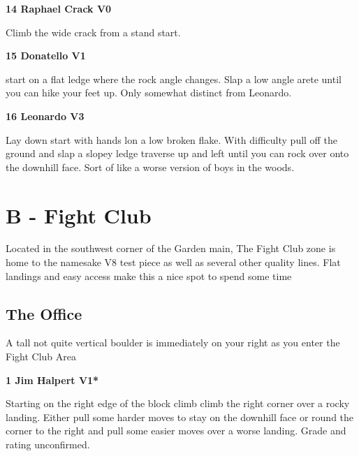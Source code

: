 \begin{multicols}{2}
					\label{rt:Raphael Crack}
\colorbox{green!20}{
\parbox{0.95\linewidth}{
\textbf{
14 Raphael Crack V0   
}
}
}

					\begin{adjustwidth}{0.5cm}{}				
					Climb the wide crack from a stand start.
					\end{adjustwidth}
					\label{rt:Donatello}
\colorbox{green!20}{
\parbox{0.95\linewidth}{
\textbf{
15 Donatello V1   
}
}
}

					\begin{adjustwidth}{0.5cm}{}				
					start on a flat ledge where the rock angle changes. Slap a low angle arete until you can hike your feet up. Only somewhat distinct from Leonardo.
					\end{adjustwidth}
					\label{rt:Leonardo}
\colorbox{green!20}{
\parbox{0.95\linewidth}{
\textbf{
16 Leonardo V3   
}
}
}

					\begin{adjustwidth}{0.5cm}{}				
					Lay down start with hands lon a low broken flake. With difficulty pull off the ground and slap a slopey ledge traverse up and left until you can rock over onto the downhill face. Sort of like a worse version of boys in the woods.
					\end{adjustwidth}
\newpage

		\section{B - Fight Club}\label{sa:Fight Club}
	Located in the southwest corner of the Garden main, The Fight Club zone is home to the namesake V8 test piece as well as several other quality lines. Flat landings and easy access make this a nice spot to spend some time\\

	
			\subsection*{The Office}\label{bf:The Office}
			A tall not quite vertical boulder is immediately on your right as you enter the Fight Club Area\\
			
					\label{rt:Jim Halpert}
\colorbox{green!20}{
\parbox{0.95\linewidth}{
\textbf{
1 Jim Halpert V1*  \warn \warn 
}
}
}

					\begin{adjustwidth}{0.5cm}{}				
					Starting on the right edge of the block climb climb the right corner over a rocky landing. Either pull some harder moves to stay on the downhill face or round the corner to the right and pull some easier moves over a worse landing. Grade and rating unconfirmed.
					\end{adjustwidth}


\end{multicols}
